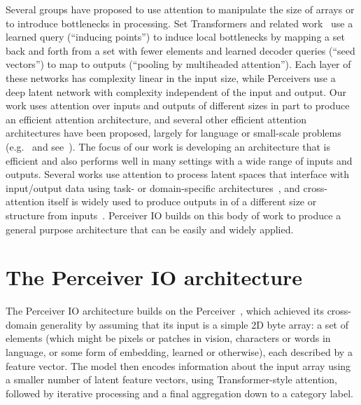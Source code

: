\documentclass{article} \usepackage{iclr2022_conference,times}
\newcommand{\ourmodel}{Perceiver IO\xspace}
\begin{document}
Several groups have proposed to use attention to manipulate the size of arrays or to introduce bottlenecks in processing. Set Transformers and related work~\citep{lee2019set,goyal2021coordination} use a learned query (``inducing points'') to induce local bottlenecks by mapping a set back and forth from a set with fewer elements and learned decoder queries (``seed vectors'') to map to outputs (``pooling by multiheaded attention''). Each layer of these networks has complexity linear in the input size, while Perceivers use a deep latent network with complexity independent of the input and output. Our work uses attention over inputs and outputs of different sizes in part to produce an efficient attention architecture, and several other efficient attention architectures have been proposed, largely for language or small-scale problems (e.g.~\citealt{xiong2021nystromformer, wang2020linformer, tay2021synthesizer, beltagy2020longformer} and see~\citealt{tay2020long}). The focus of our work is developing an architecture that is efficient and also performs well in many settings with a wide range of inputs and outputs. Several works use attention to process latent spaces that interface with input/output data using task- or domain-specific architectures~\citep{carion2020endtoend, locatello2020object, wang2021maxdeeplab}, and cross-attention itself is widely used to produce outputs in of a different size or structure from inputs~\citep{dai2019transformerxl,desai2021virtex,miech2021thinking, vaswani2017attention, raffell2020exploring,santoro2018relational, hudson2021generative, ma2021luna}. \ourmodel{} builds on this body of work to produce a general purpose architecture that can be easily and widely applied.

\section{The \ourmodel{} architecture}

The \ourmodel{} architecture builds on the Perceiver~\citep{jaegle2021perceiver}, which achieved its cross-domain generality by assuming that its input is a simple 2D byte array: a set of elements (which might be pixels or patches in vision, characters or words in language, or some form of embedding, learned or otherwise), each described by a feature vector.  The model then encodes information about the input array using a smaller number of latent feature vectors, using Transformer-style attention, followed by iterative processing and a final aggregation down to a category label.
\end{document}
